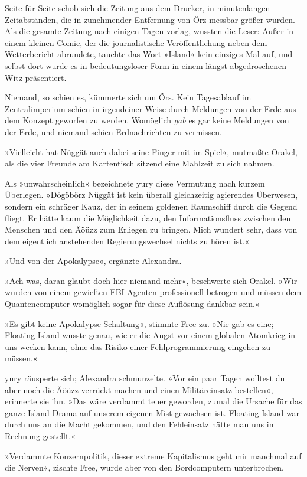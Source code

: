 Seite für Seite schob sich die Zeitung aus dem Drucker, in minutenlangen Zeitabständen, die in zunehmender Entfernung von Örz messbar größer wurden. Als die gesamte Zeitung nach einigen Tagen vorlag, wussten die Leser: Außer in einem kleinen Comic, der die journalistische Veröffentlichung neben dem Wetterbericht abrundete, tauchte das Wort »Island« kein einziges Mal auf, und selbst dort wurde es in bedeutungsloser Form in einem längst abgedroschenen Witz präsentiert.

Niemand, so schien es, kümmerte sich um Örs. Kein Tagesablauf im Zentralimperium schien in irgendeiner Weise durch Meldungen von der Erde aus dem Konzept geworfen zu werden. Womöglich \emph{gab} es gar keine Meldungen von der Erde, und niemand schien Erdnachrichten zu vermissen.

»Vielleicht hat Nüggät auch dabei seine Finger mit im Spiel«, mutmaßte Orakel, als die vier Freunde am Kartentisch sitzend eine Mahlzeit zu sich nahmen.

Als »unwahrscheinlich« bezeichnete yury diese Vermutung nach kurzem Überlegen. »Dögöbörz Nüggät ist kein überall gleichzeitig agierendes Überwesen, sondern ein schräger Kauz, der in seinem goldenen Raumschiff durch die Gegend fliegt. Er hätte kaum die Möglichkeit dazu, den Informationsfluss zwischen den Menschen und den Äöüzz zum Erliegen zu bringen. Mich wundert sehr, dass von dem eigentlich anstehenden Regierungswechsel nichts zu hören ist.«

»Und von der Apokalypse«, ergänzte Alexandra.

»Ach was, daran glaubt doch hier niemand mehr«, beschwerte sich Orakel. »Wir wurden von einem gewieften FBI-Agenten professionell betrogen und müssen dem Quantencomputer womöglich sogar für diese Auflösung dankbar sein.«

»Es gibt keine Apokalypse-Schaltung«, stimmte Free zu. »Nie gab es eine; Floating Island wusste genau, wie er die Angst vor einem globalen Atomkrieg in uns wecken kann, ohne das Risiko einer Fehlprogrammierung eingehen zu müssen.«

yury räusperte sich; Alexandra schmunzelte. »Vor ein paar Tagen wolltest du aber noch die Äöüzz verrückt machen und einen Militäreinsatz bestellen«, erinnerte sie ihn. »Das wäre verdammt teuer geworden, zumal die Ursache für das ganze Island-Drama auf unserem eigenen Mist gewachsen ist. Floating Island war durch uns an die Macht gekommen, und den Fehleinsatz hätte man uns in Rechnung gestellt.«

»Verdammte Konzernpolitik, dieser extreme Kapitalismus geht mir manchmal auf die Nerven«, zischte Free, wurde aber von den Bordcomputern unterbrochen.

